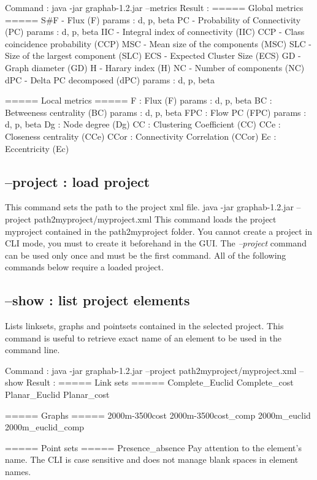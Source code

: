 \documentclass[a4paper,10pt]{report}
\newenvironment{cmd}
{\quote\Verbatim}
{\endVerbatim\endquote}
\begin{document}
Command :
\begin{cmd}
java -jar graphab-1.2.jar --metrics
\end{cmd}
Result :
\begin{cmd}
===== Global metrics =====
S#F -  Flux (F)
       params : d, p, beta
PC - Probability of Connectivity (PC)
       params : d, p, beta
IIC - Integral index of connectivity (IIC)
CCP - Class coincidence probability (CCP)
MSC - Mean size of the components (MSC)
SLC - Size of the largest component (SLC)
ECS - Expected Cluster Size (ECS)
GD - Graph diameter (GD)
H - Harary index (H)
NC - Number of components (NC)
dPC - Delta PC decomposed (dPC)
       params : d, p, beta

===== Local metrics =====
F : Flux (F)
       params : d, p, beta
BC : Betweeness centrality (BC)
       params : d, p, beta
FPC : Flow PC (FPC)
       params : d, p, beta
Dg : Node degree (Dg)
CC : Clustering Coefficient (CC)
CCe : Closeness centrality (CCe)
CCor : Connectivity Correlation (CCor)
Ec : Eccentricity (Ec)

\end{cmd}

\subsection{--project : load project}
This command sets the path to the project xml file.
\begin{cmd}
java -jar graphab-1.2.jar --project path2myproject/myproject.xml
\end{cmd}
This command loads the project myproject contained in the path2myproject folder.
You cannot create a project in CLI mode, you must to create it beforehand in the GUI.
The \textit{--project} command can be used only once and must be the first command.
All of the following commands below require a loaded project. 

\subsection{--show : list project elements}
Lists linksets, graphs and pointsets contained in the selected project. This command is useful to retrieve exact name of an element to be used in the command line.

Command :
\begin{cmd}
java -jar graphab-1.2.jar --project path2myproject/myproject.xml --show
\end{cmd}
Result :
\begin{cmd}
===== Link sets =====
Complete_Euclid
Complete_cost
Planar_Euclid
Planar_cost

===== Graphs =====
2000m-3500cost
2000m-3500cost_comp
2000m_euclid
2000m_euclid_comp

===== Point sets =====
Presence_absence
\end{cmd}
Pay attention to the element's name. The CLI is case sensitive and does not manage blank spaces in element names.
\end{document}
